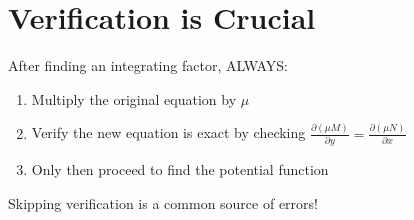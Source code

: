 \documentclass[12pt]{article}
\begin{document}
\section{Verification is Crucial}

\begin{warning}
After finding an integrating factor, ALWAYS:
\begin{enumerate}
    \item Multiply the original equation by $\mu$
    \item Verify the new equation is exact by checking $\frac{\partial(\mu M)}{\partial y} = \frac{\partial(\mu N)}{\partial x}$
    \item Only then proceed to find the potential function
\end{enumerate}
Skipping verification is a common source of errors!
\end{warning}
\end{document}
